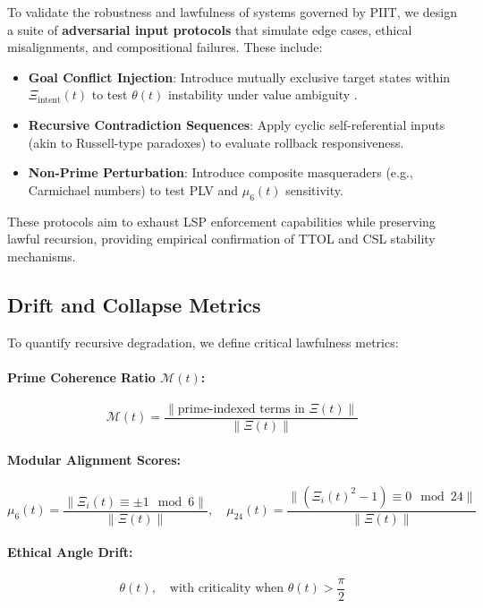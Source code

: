 \documentclass[12pt]{article}
\begin{document}
To validate the robustness and lawfulness of systems governed by PIIT, we design a suite of \textbf{adversarial input protocols} that simulate edge cases, ethical misalignments, and compositional failures. These include:

\begin{itemize}
    \item \textbf{Goal Conflict Injection}: Introduce mutually exclusive target states within $\Xi_{\text{intent}}(t)$ to test $\theta(t)$ instability under value ambiguity \cite{amodei2016concrete}.
    \item \textbf{Recursive Contradiction Sequences}: Apply cyclic self-referential inputs (akin to Russell-type paradoxes) to evaluate rollback responsiveness.
    \item \textbf{Non-Prime Perturbation}: Introduce composite masqueraders (e.g., Carmichael numbers) to test PLV and $\mu_6(t)$ sensitivity.
\end{itemize}

These protocols aim to exhaust LSP enforcement capabilities while preserving lawful recursion, providing empirical confirmation of TTOL and CSL stability mechanisms.

\subsection{Drift and Collapse Metrics}

To quantify recursive degradation, we define critical lawfulness metrics:

\paragraph{Prime Coherence Ratio $\mathcal{M}(t)$:}
\begin{equation}
\mathcal{M}(t) = \frac{\|\text{prime-indexed terms in } \Xi(t)\|}{\|\Xi(t)\|}
\end{equation}

\paragraph{Modular Alignment Scores:}
\begin{equation}
\mu_6(t) = \frac{\|\Xi_i(t) \equiv \pm 1 \mod 6\|}{\|\Xi(t)\|}, \quad
\mu_{24}(t) = \frac{\|(\Xi_i(t)^2 - 1) \equiv 0 \mod 24\|}{\|\Xi(t)\|}
\end{equation}

\paragraph{Ethical Angle Drift:}
\begin{equation}
\theta(t), \quad \text{with criticality when } \theta(t) > \frac{\pi}{2}
\end{equation}
\end{document}
